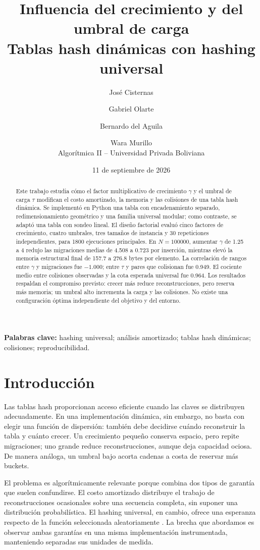 \documentclass[11pt]{article}
\title{\bfseries Influencia del crecimiento y del umbral de carga\\
\large Tablas hash dinámicas con hashing universal}
\author{José Cisternas \and Gabriel Olarte \and Bernardo del Aguila \and Wara Murillo\\
\normalsize Algorítmica II -- Universidad Privada Boliviana}
\date{11 de septiembre de 2026}
\begin{document}
\maketitle

\begin{abstract}
Este trabajo estudia cómo el factor multiplicativo de crecimiento $\gamma$ y el umbral de carga $\tau$ modifican el costo amortizado, la memoria y las colisiones de una tabla hash dinámica. Se implementó en Python una tabla con encadenamiento separado, redimensionamiento geométrico y una familia universal modular; como contraste, se adaptó una tabla con sondeo lineal. El diseño factorial evaluó cinco factores de crecimiento, cuatro umbrales, tres tamaños de instancia y 30 repeticiones independientes, para 1800 ejecuciones principales. En $N=100000$, aumentar $\gamma$ de 1.25 a 4 redujo las migraciones medias de 4.508 a 0.723 por inserción, mientras elevó la memoria estructural final de 157.7 a 276.8 bytes por elemento. La correlación de rangos entre $\gamma$ y migraciones fue $-1.000$; entre $\tau$ y pares que colisionan fue 0.949. El cociente medio entre colisiones observadas y la cota esperada universal fue 0.964. Los resultados respaldan el compromiso previsto: crecer más reduce reconstrucciones, pero reserva más memoria; un umbral alto incrementa la carga y las colisiones. No existe una configuración óptima independiente del objetivo y del entorno.
\end{abstract}

\noindent\textbf{Palabras clave:} hashing universal; análisis amortizado; tablas hash dinámicas; colisiones; reproducibilidad.

\section{Introducción}
Las tablas hash proporcionan acceso eficiente cuando las claves se distribuyen adecuadamente. En una implementación dinámica, sin embargo, no basta con elegir una función de dispersión: también debe decidirse cuándo reconstruir la tabla y cuánto crecer. Un crecimiento pequeño conserva espacio, pero repite migraciones; uno grande reduce reconstrucciones, aunque deja capacidad ociosa. De manera análoga, un umbral bajo acorta cadenas a costa de reservar más buckets.

El problema es algorítmicamente relevante porque combina dos tipos de garantía que suelen confundirse. El costo amortizado distribuye el trabajo de reconstrucciones ocasionales sobre una secuencia completa, sin suponer una distribución probabilística. El hashing universal, en cambio, ofrece una esperanza respecto de la función seleccionada aleatoriamente \cite{CarterWegman1979,Tarjan1985}. La brecha que abordamos es observar ambas garantías en una misma implementación instrumentada, manteniendo separadas sus unidades de medida.
\end{document}
